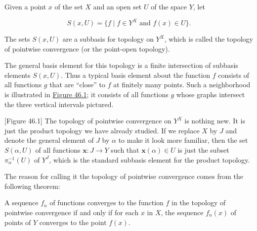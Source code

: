 \begin{definition}
Given a point \(x\) of the set \(X\) and an open set \(U\) of the space \(Y\), let

\[
S({x,U}) = \{ {f \mid f \in {Y}^{X}\text{ and }f(x) \in U}\}.
\]

The sets \(S({x,U})\) are a subbasis for topology on \(Y^{X}\), which is called the topology of pointwise convergence (or the point-open topology).
\end{definition}

The general basis element for this topology is a finite intersection of subbasis elements \(S({x,U})\). Thus a typical basis element about the function \(f\) consists of all functions \(g\) that are ``close'' to \(f\) at finitely many points. Such a neighborhood is illustrated in \hyperref[fig:46.1]{Figure 46.1}; it consists of all functions \(g\) whose graphs intersect the three vertical intervals pictured.

[Figure 46.1]
The topology of pointwise convergence on \(Y^{X}\) is nothing new. It is just the product topology we have already studied. If we replace \(X\) by \(J\) and denote the general element of \(J\) by \(\alpha\) to make it look more familiar, then the set \(S({\alpha, U})\) of all functions \(\mathbf{x} : J \rightarrow Y\) such that \(\mathbf{x}( \alpha ) \in U\) is just the subset \({\pi }_{\alpha }^{-1}( U)\) of \(Y^{J}\), which is the standard subbasis element for the product topology.

The reason for calling it the topology of pointwise convergence comes from the following theorem:

\begin{theorem}
\label{thm:\thetheorem}
A sequence \(f_{n}\) of functions converges to the function \(f\) in the topology of pointwise convergence if and only if for each \(x\) in \(X\), the sequence \(f_{n}(x)\) of points of \(Y\) converges to the point \(f(x)\).
\end{theorem}

